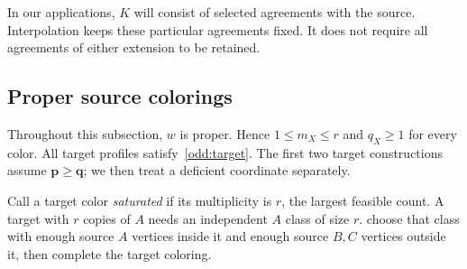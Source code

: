 \documentclass[11pt,reqno]{amsart}
\numberwithin{equation}{section}
\theoremstyle{definition}
\theoremstyle{remark}
\begin{document}
In our applications, $K$ will consist of selected agreements with the
source. Interpolation keeps these particular agreements fixed. It does
not require all agreements of either extension to be retained.

\subsection{Proper source colorings}

Throughout this subsection, $w$ is proper. Hence
$1\le m_X\le r$ and $q_X\ge1$ for every color. All target profiles
satisfy~\eqref{odd:target}. The first two target constructions assume
$\mathbf p\ge\mathbf q$; we then treat a deficient coordinate separately.

Call a target color \emph{saturated} if its multiplicity is $r$,
the largest feasible count. A target with $r$ copies of $A$ needs an independent $A$ class of size
$r$.  choose that class with enough source $A$
vertices inside it and enough source $B,C$ vertices outside it, then
complete the target coloring.
\end{document}
